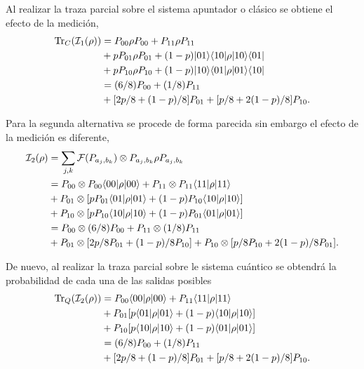 Al realizar la traza parcial sobre el sistema apuntador o clásico se obtiene el efecto de la medición, \begin{equation}\label{traza_A1_ejemplo1}
    \begin{split}
        {\rm Tr}_C(\mathcal{I}_1(\rho)) &= P_{00} \rho P_{00} + P_{11}\rho P_{11}\\
        &+p P_{01}\rho P_{01}+(1-p) |01\rangle \langle 10|\rho|10\rangle \langle01|\\
        &+p P_{10}\rho P_{10}+(1-p) |10\rangle \langle 01|\rho|01\rangle \langle10|\\
        &=(6/8)P_{00} + (1/8)P_{11}\\
        &+[2p/8 +(1-p)/8]P_{01}+ [p/8+2(1-p)/8]P_{10}.\\
    \end{split}
\end{equation}

Para la segunda alternativa se procede de forma parecida sin embargo el efecto de la medición es diferente, \begin{equation}\label{segunda_alternativa_ejemplo1}
    \begin{split}
        \mathcal{I}_2(\rho)&=\sum_{j,k}\mathcal{F}(P_{a_j,b_k})\otimes P_{a_j,b_k} \rho P_{a_j,b_k}\\
        &=P_{00}\otimes P_{00} \langle 00|\rho|00\rangle + P_{11}\otimes P_{11} \langle 11|\rho|11\rangle\\
        &+P_{01} \otimes [pP_{01} \langle 01|\rho|01\rangle+(1-p)P_{10}\langle 10|\rho|10\rangle]\\
        &+P_{10} \otimes [p P_{10}\langle 10|\rho|10\rangle+(1-p)P_{01}\langle 01|\rho|01\rangle]\\
        &=P_{00}\otimes (6/8)P_{00} + P_{11}\otimes (1/8)P_{11}\\
        &+   P_{01} \otimes [2p/8P_{01} +(1-p)/8P_{10}]+P_{10} \otimes[p/8 P_{10}+2(1-p)/8 P_{01}].\\
    \end{split}
\end{equation}


De nuevo, al realizar la traza parcial sobre le sistema cuántico se obtendrá la probabilidad de cada una de las salidas posibles \begin{equation}\label{traza_S2_ejemplo1}
    \begin{split}
        {\rm Tr}_Q(\mathcal{I}_2(\rho)) &= P_{00} \langle 00|\rho|00\rangle + P_{11} \langle 11|\rho|11\rangle\\
        &+P_{01}[p \langle 01|\rho|01\rangle+(1-p)\langle 10|\rho|10\rangle]\\
        &+P_{10}[p \langle 10|\rho|10\rangle+(1-p)\langle 01|\rho|01\rangle]\\
        &=(6/8)P_{00} + (1/8)P_{11}\\
        &+[2p/8 +(1-p)/8]P_{01}+ [p/8+2(1-p)/8]P_{10}.\\
    \end{split}
\end{equation}

